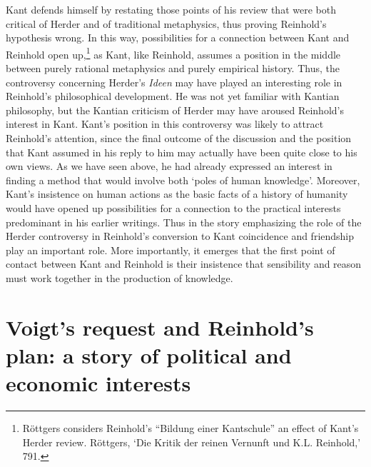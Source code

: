 Kant defends himself by restating those points of his review that were both critical of Herder and of traditional metaphysics, thus proving Reinhold's hypothesis wrong. In this way, possibilities for a connection between Kant and Reinhold open up,\footnote{ R\"{o}ttgers considers Reinhold's ``Bildung einer Kantschule'' an effect of Kant's Herder review. R\"{o}ttgers, `Die Kritik der reinen Vernunft und K.L. Reinhold,' 791. } as Kant, like Reinhold, assumes a position in the middle between purely rational metaphysics and purely empirical history. Thus, the controversy concerning Herder's \textit{Ideen} may have played an interesting role in Reinhold's philosophical development. He was not yet familiar with Kantian philosophy, but the Kantian criticism of Herder may have aroused Reinhold's interest in Kant. Kant's position in this controversy was likely to attract Reinhold's attention, since the final outcome of the discussion and the position that Kant assumed in his reply to him may actually have been quite close to his own views. As we have seen above, he had already expressed an interest in finding a method that would involve both `poles of human knowledge'. Moreover, Kant's insistence on human actions as the basic facts of a history of humanity would have opened up possibilities for a connection to the practical interests predominant in his earlier writings. Thus in the story emphasizing the role of the Herder controversy in Reinhold's conversion to Kant coincidence and friendship play an important role. More importantly, it emerges that the first point of contact between Kant and Reinhold is their insistence that sensibility and reason must work together in the production of knowledge. 


\section{Voigt's request and Reinhold's plan: a story of political and economic interests}


